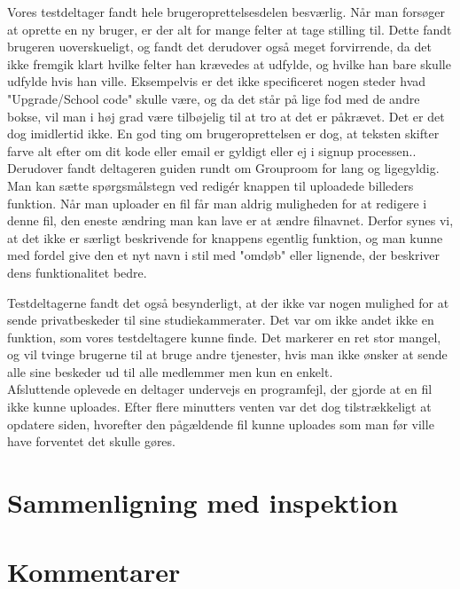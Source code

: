 \documentclass[12pt]{article}
\begin{document}
\noindent Vores testdeltager fandt hele brugeroprettelsesdelen besværlig. Når man forsøger at oprette en ny bruger, er der alt for mange felter at tage stilling til. Dette fandt brugeren uoverskueligt, og fandt det derudover også meget forvirrende, da det ikke fremgik klart hvilke felter han krævedes at udfylde, og hvilke han bare skulle udfylde hvis han ville. Eksempelvis er det ikke specificeret nogen steder hvad "Upgrade/School code" skulle være, og da det står på lige fod med de andre bokse, vil man i høj grad være tilbøjelig til at tro at det er påkrævet. Det er det dog imidlertid ikke. En god ting om brugeroprettelsen er dog, at teksten skifter farve alt efter om dit kode eller email er gyldigt eller ej i signup processen.. Derudover fandt deltageren guiden rundt om Grouproom for lang og ligegyldig.\\

\noindent Man kan sætte spørgsmålstegn ved redigér knappen til uploadede billeders funktion. Når man uploader en fil får man aldrig muligheden for at redigere i denne fil, den eneste ændring man kan lave er at ændre filnavnet. Derfor synes vi, at det ikke er særligt beskrivende for knappens egentlig funktion, og man kunne med fordel give den et nyt navn i stil med "omdøb" eller lignende, der beskriver dens funktionalitet bedre.\\

\newpage

\noindent Testdeltagerne fandt det også besynderligt, at der ikke var nogen mulighed for at sende privatbeskeder til sine studiekammerater. Det var om ikke andet ikke en funktion, som vores testdeltagere kunne finde. Det markerer en ret stor mangel, og vil tvinge brugerne til at bruge andre tjenester, hvis man ikke ønsker at sende alle sine beskeder ud til alle medlemmer men kun en enkelt.\\

\noindent Afsluttende oplevede en deltager undervejs en programfejl, der gjorde at en fil ikke kunne uploades. Efter flere minutters venten var det dog tilstrækkeligt at opdatere siden, hvorefter den pågældende fil kunne uploades som man før ville have forventet det skulle gøres.
\section{Sammenligning med inspektion}

\section{Kommentarer}
\end{document}
